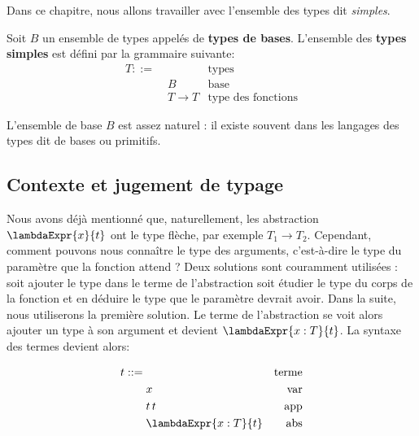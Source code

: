 Dans ce chapitre, nous allons travailler avec l'ensemble des types dit
\textit{simples}.

\begin{definition}
  \label{def:simply-typed-lambda-calculus-types}
  Soit $B$ un ensemble de types appelés de \textbf{types de bases}.
  L'ensemble des \textbf{types simples} est défini par la grammaire suivante:
  \begin{align*}
    T ::= & \, & \text{types} \\
          & \; B & \text{base} \\
          & \; T \rightarrow T & \text{type des fonctions}
  \end{align*}
\end{definition}

L'ensemble de base $B$ est assez naturel : il existe souvent dans les langages
des types dit de bases ou primitifs.



\subsection*{Contexte et jugement de typage}

Nous avons déjà mentionné que, naturellement, les abstraction $\lambdaExpr{x}{t}$ ont le type
flèche, par exemple $T_{1} \rightarrow T_{2}$. Cependant, comment pouvons nous
connaître le type des arguments, c'est-à-dire le type du paramètre que la
fonction attend ? Deux solutions sont couramment utilisées : soit ajouter le type
dans le terme de l'abstraction soit étudier le type du corps de la fonction et
en déduire le type que le paramètre devrait avoir.
Dans la suite, nous utiliserons la première solution. Le terme de l'abstraction
se voit alors ajouter un type à son argument et devient $\lambdaExpr{x : T}{t}$.
La syntaxe des termes devient alors:

\begin{align*}
  \label{def:simply-typed-lambda-calculus-terms}
  t ::= & \, & \text{terme} \\
        & \; x & \text{var} \\
        & \; t \, t & \text{app} \\
        & \; \lambdaExpr{x : T}{t} & \text{abs}
\end{align*}

